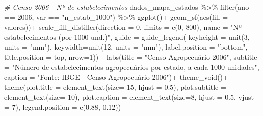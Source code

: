 \documentclass[
  brazilian,
]{book}
\newenvironment{Shaded}{\begin{snugshade}}{\end{snugshade}}
\newcommand{\AttributeTok}[1]{\textcolor[rgb]{0.77,0.63,0.00}{#1}}
\newcommand{\CommentTok}[1]{\textcolor[rgb]{0.56,0.35,0.01}{\textit{#1}}}
\newcommand{\DecValTok}[1]{\textcolor[rgb]{0.00,0.00,0.81}{#1}}
\newcommand{\FloatTok}[1]{\textcolor[rgb]{0.00,0.00,0.81}{#1}}
\newcommand{\FunctionTok}[1]{\textcolor[rgb]{0.00,0.00,0.00}{#1}}
\newcommand{\NormalTok}[1]{#1}
\newcommand{\SpecialCharTok}[1]{\textcolor[rgb]{0.00,0.00,0.00}{#1}}
\newcommand{\StringTok}[1]{\textcolor[rgb]{0.31,0.60,0.02}{#1}}
\begin{document}
\begin{Shaded}
\begin{Highlighting}[]
\CommentTok{\# Censo 2006 {-} Nº de estabelecimentos}
\NormalTok{dados\_mapa\_estados }\SpecialCharTok{\%\textgreater{}\%} 
  \FunctionTok{filter}\NormalTok{(ano }\SpecialCharTok{==} \DecValTok{2006}\NormalTok{,}
\NormalTok{         var }\SpecialCharTok{==} \StringTok{"n\_estab\_1000"}\NormalTok{) }\SpecialCharTok{\%\textgreater{}\%} 
  \FunctionTok{ggplot}\NormalTok{()}\SpecialCharTok{+}
  \FunctionTok{geom\_sf}\NormalTok{(}\FunctionTok{aes}\NormalTok{(}\AttributeTok{fill =}\NormalTok{ valores))}\SpecialCharTok{+}
  \FunctionTok{scale\_fill\_distiller}\NormalTok{(}\AttributeTok{direction =} \DecValTok{0}\NormalTok{,}
                       \AttributeTok{limits =} \FunctionTok{c}\NormalTok{(}\DecValTok{0}\NormalTok{, }\DecValTok{800}\NormalTok{),}
                       \AttributeTok{name =} \StringTok{"Nº estabelecimentos (por 1000 und.)"}\NormalTok{,}
                       \AttributeTok{guide =} \FunctionTok{guide\_legend}\NormalTok{(}
                         \AttributeTok{keyheight =} \FunctionTok{unit}\NormalTok{(}\DecValTok{3}\NormalTok{, }\AttributeTok{units =} \StringTok{"mm"}\NormalTok{),}
                         \AttributeTok{keywidth=}\FunctionTok{unit}\NormalTok{(}\DecValTok{12}\NormalTok{, }\AttributeTok{units =} \StringTok{"mm"}\NormalTok{),}
                         \AttributeTok{label.position =} \StringTok{"bottom"}\NormalTok{,}
                         \AttributeTok{title.position =} \StringTok{\textquotesingle{}top\textquotesingle{}}\NormalTok{, }\AttributeTok{nrow=}\DecValTok{1}\NormalTok{))}\SpecialCharTok{+}
  \FunctionTok{labs}\NormalTok{(}\AttributeTok{title =} \StringTok{"Censo Agropecuário 2006"}\NormalTok{,}
       \AttributeTok{subtitle =} \StringTok{"Número de estabelecimentos agropecuários por estado, a cada 1000 unidades"}\NormalTok{,}
       \AttributeTok{caption =} \StringTok{"Fonte: IBGE {-} Censo Agropecuário 2006"}\NormalTok{)}\SpecialCharTok{+}
  \FunctionTok{theme\_void}\NormalTok{()}\SpecialCharTok{+}
  \FunctionTok{theme}\NormalTok{(}\AttributeTok{plot.title =} \FunctionTok{element\_text}\NormalTok{(}\AttributeTok{size=} \DecValTok{15}\NormalTok{, }\AttributeTok{hjust =} \FloatTok{0.5}\NormalTok{),}
        \AttributeTok{plot.subtitle =} \FunctionTok{element\_text}\NormalTok{(}\AttributeTok{size=} \DecValTok{10}\NormalTok{),}
        \AttributeTok{plot.caption =} \FunctionTok{element\_text}\NormalTok{(}\AttributeTok{size=}\DecValTok{8}\NormalTok{, }\AttributeTok{hjust =} \FloatTok{0.5}\NormalTok{, }\AttributeTok{vjust =} \DecValTok{7}\NormalTok{),}
        \AttributeTok{legend.position =} \FunctionTok{c}\NormalTok{(}\FloatTok{0.88}\NormalTok{, }\FloatTok{0.12}\NormalTok{))}
\end{Highlighting}
\end{Shaded}
\end{document}
